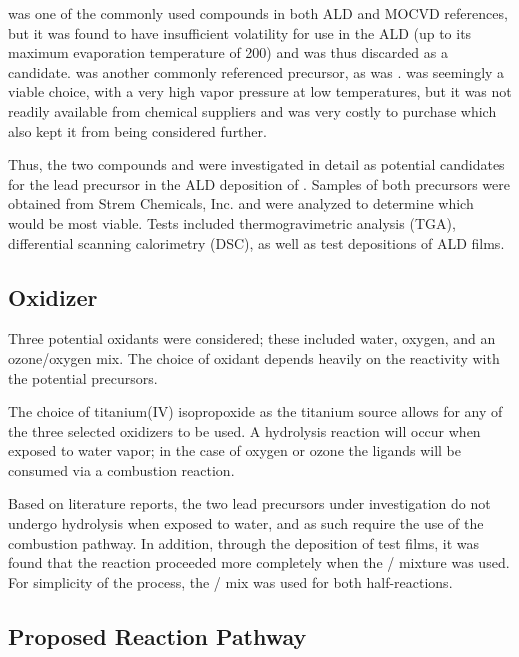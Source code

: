  was one of the commonly used compounds in both ALD and MOCVD references, but it was found to have insufficient volatility for use in the ALD (up to its maximum evaporation temperature of 200\degC{})\cite{harjuoja_2006} and was thus discarded as a candidate. \TMHD{} was another commonly referenced precursor\cite{watanabe_growth_2007}, as was \HFAc{}.\cite{Igumenov_1998}  was seemingly a viable choice, with a very high vapor pressure at low temperatures,\cite{Hwang_2007} but it was not readily available from chemical suppliers and was very costly to purchase which also kept it from being considered further. 

Thus, the two compounds \HFAc{} and \TMHD{} were investigated in detail as potential candidates for the lead precursor in the ALD deposition of \PTO{}. Samples of both precursors were obtained from Strem Chemicals, Inc.\cite{strem_inc} and were analyzed to determine which would be most viable. Tests included thermogravimetric analysis (TGA), differential scanning calorimetry (DSC), as well as test depositions of ALD films. 


\subsection{Oxidizer}

Three potential oxidants were considered; these included water, oxygen, and an ozone/oxygen mix. The choice of oxidant depends heavily on the reactivity with the potential precursors. 

The choice of titanium(IV) isopropoxide as the titanium source allows for any of the three selected oxidizers to be used. A hydrolysis reaction will occur when exposed to water vapor; in the case of oxygen or ozone the ligands will be consumed via a combustion reaction.\cite{ALD-Handbook,Leskela_2002,lim_atomic_2003}

Based on literature reports, the two lead precursors under investigation do not undergo hydrolysis when exposed to water, and as such require the use of the combustion pathway. In addition, through the deposition of test films, it was found that the reaction proceeded more completely when the / mixture was used. For simplicity of the process, the / mix was used for both half-reactions.\cite{KeunKim2005103}



\subsection{Proposed Reaction Pathway}


